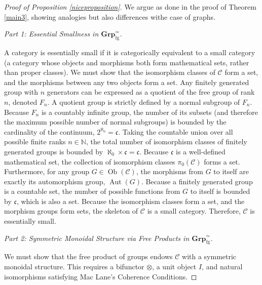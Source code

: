 \documentclass{amsart}
\begin{document}
\begin{proof}[Proof of Proposition \ref{niceproposition}] We argue as done in the proof of Theorem \ref{main3}, showing analogies but also differences withe case of graphs.

\medskip

\textit{Part 1: Essential Smallness in $\mathbf{Grp}_{\mathrm{fg}}^{\simeq}$.}

\medskip


A category is essentially small if it is categorically equivalent to a small category (a category whose objects and morphisms both form mathematical sets, rather than proper classes). We must show that the isomorphism classes of $\mathcal{C}$ form a set, and the morphisms between any two objects form a set. Any finitely generated group with $n$ generators can be expressed as a quotient of the free group of rank $n$, denoted $F_n$. A quotient group is strictly defined by a normal subgroup of $F_n$. Because $F_n$ is a countably infinite group, the number of its subsets (and therefore the maximum possible number of normal subgroups) is bounded by the cardinality of the continuum, $2^{\aleph_0} = \mathfrak{c}$.
Taking the countable union over all possible finite ranks $n \in \mathbb{N}$, the total number of isomorphism classes of finitely generated groups is bounded by $\aleph_0 \times \mathfrak{c} = \mathfrak{c}$. Because $\mathfrak{c}$ is a well-defined mathematical set, the collection of isomorphism classes $\pi_0(\mathcal{C})$ forms a set. Furthermore, for any group $G \in \operatorname{Ob}(\mathcal{C})$, the morphisms from $G$ to itself are exactly its automorphism group, $\operatorname{Aut}(G)$. Because a finitely generated group is a countable set, the number of possible functions from $G$ to itself is bounded by $\mathfrak{c}$, which is also a set. Because the isomorphism classes form a set, and the morphism groups form sets, the skeleton of $\mathcal{C}$ is a small category. Therefore, $\mathcal{C}$ is essentially small.

\medskip

\textit{Part 2: Symmetric Monoidal Structure via Free Products in $\mathbf{Grp}_{\mathrm{fg}}^{\simeq}$.}

\medskip

We must show that the free product of groups endows $\mathcal{C}$ with a symmetric monoidal structure. This requires a bifunctor $\otimes$, a unit object $I$, and natural isomorphisms  satisfying Mac Lane's Coherence Conditions.

\medskip


\end{proof}
\end{document}
